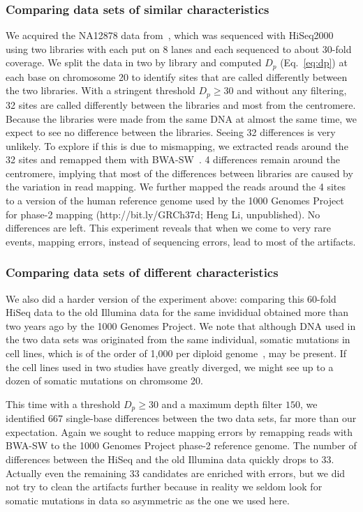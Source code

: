 \documentclass{bioinfo}
\begin{document}
\subsubsection{Comparing data sets of similar characteristics}
We acquired the NA12878 data from~\citep{Depristo:2011vn}, which was sequenced
with HiSeq2000 using two libraries with each put on 8 lanes and each sequenced
to about 30-fold coverage.  We split the data in two by library and computed
$D_p$ (Eq.~\eqref{eq:dp}) at each base on chromosome 20 to identify sites that
are called differently between the two libraries.  With a stringent threshold
$D_p\ge 30$ and without any filtering, 32 sites are called differently between
the libraries and most from the centromere. Because the libraries were made
from the same DNA at almost the same time, we expect to see no difference
between the libraries. Seeing 32 differences is very unlikely. To explore if
this is due to mismapping, we extracted reads around the 32 sites and remapped
them with BWA-SW~\citep{Li:2010fk}. 4 differences remain around the centromere,
implying that most of the differences between libraries are caused by the
variation in read mapping.  We further mapped the reads around the 4 sites to a
version of the human reference genome used by the 1000 Genomes Project for
phase-2 mapping (http://bit.ly/GRCh37d; Heng Li, unpublished).  No differences
are left. This experiment reveals that when we come to very rare events,
mapping errors, instead of sequencing errors, lead to most of the artifacts.

\subsubsection{Comparing data sets of different characteristics}
We also did a harder version of the experiment above: comparing this 60-fold
HiSeq data to the old Illumina data for the same invididual obtained more than
two years ago by the 1000 Genomes Project. We note that although DNA used in
the two data sets was originated from the same individual, somatic mutations in
cell lines, which is of the order of 1,000 per diploid
genome~\citep{Conrad:2011kx}, may be present. If the cell lines used in two
studies have greatly diverged, we might see up to a dozen of somatic mutations
on chromsome 20.

This time with a threshold $D_p\ge 30$ and a maximum depth filter $150$, we
identified 667 single-base differences between the two data sets, far more than
our expectation. Again we sought to reduce mapping errors by remapping reads
with BWA-SW to the 1000 Genomes Project phase-2 reference genome. The number of
differences between the HiSeq and the old Illumina data quickly drops to 33.
Actually even the remaining 33 candidates are enriched with errors, but we did
not try to clean the artifacts further because in reality we seldom look for
somatic mutations in data so asymmetric as the one we used here.
\end{document}

